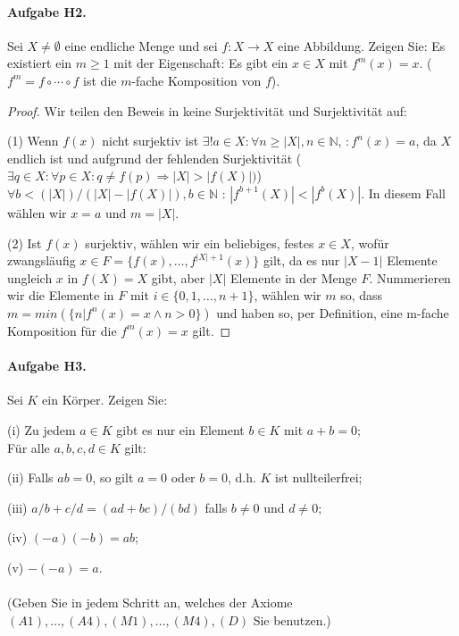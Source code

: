 \documentclass[12pt, letterpaper]{article}
\begin{document}
\paragraph{Aufgabe H2.}

Sei $X \neq \emptyset $ eine endliche Menge und sei $f : X \rightarrow X$ eine Abbildung.
Zeigen Sie: Es existiert ein $m \geq  1$ mit der Eigenschaft: Es gibt ein $x \in X$ mit
$f^m(x) = x$. ($f^m = f \circ \cdots \circ f$ ist die $m$-fache Komposition von $f$).

\begin{proof}
    Wir teilen den Beweis in keine Surjektivität und Surjektivität auf: \par
    (1) Wenn $f(x)$ nicht surjektiv ist $\exists! a \in X : \forall  n \geq |X|, n \in \mathbb{N}$, $: f^n(x)=a $, 
    da $X$ endlich ist und aufgrund der fehlenden Surjektivität ($\exists q \in X : \forall p \in X : q \neq f(p) \Rightarrow |X|>|f(X)|) $) 
    $\forall  b < (|X|)/(|X|-|f(X)|), b \in \mathbb{N}$ : $|f^{b+1}(X)| < |f^b(X)|$.
    In diesem Fall wählen wir $x=a$  und $m=|X|$. \par
    (2) Ist $f(x)$ surjektiv, wählen wir ein beliebiges, festes $x \in X$, wofür zwangsläufig $x \in F=\{f(x),\ldots,f^{|X|+1}(x)\}$ gilt, 
    da es nur $|X-1|$ Elemente ungleich $x$  in $f(X)=X$ gibt, aber $|X|$ Elemente in der Menge $F$.
    Nummerieren wir die Elemente in $F$ mit $i\in\{0,1,\ldots,n+1\}$, wählen wir $m$ so, dass $m = min(\{n | f^n(x)=x \land n>0 \})$
    und haben so, per Definition, eine m-fache Komposition für die $f^m(x)=x$ gilt.
\end{proof}

\paragraph{Aufgabe H3.}

Sei $K$ ein Körper. Zeigen Sie:
\par
    (i) Zu jedem $a \in K$ gibt es nur ein Element $b \in K$ mit $a + b = 0$;\\ Für alle $a, b, c, d \in K$ gilt:\par
(ii) Falls $ab = 0$, so gilt $a = 0$ oder $b = 0$, d.h. $K$ ist nullteilerfrei; \par
(iii) $a/b + c/d = (ad + bc)/(bd)$ falls $b \neq 0$ und $d \neq 0$; \par
(iv) $(-a)(-b) = ab$; \par
(v) $-(-a) = a$. \\ \\  
(Geben Sie in jedem Schritt an, welches der Axiome $(A1), \ldots , (A4), (M 1), \ldots , (M 4), (D)$
Sie benutzen.)
\end{document}
